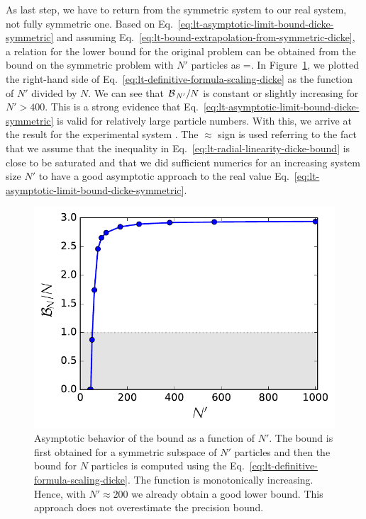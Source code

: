 As last step, we have to return from the symmetric system to our real system, not fully symmetric one.
Based on Eq.~\eqref{eq:lt-asymptotic-limit-bound-dicke-symmetric} and assuming Eq.~\eqref{eq:lt-bound-extrapolation-from-symmetric-dicke}, a relation for the lower bound for the original problem can be obtained from the bound on the symmetric problem with $N'$ particles as
\be
  \label{eq:lt-definitive-formula-scaling-dicke}
  \approx {}  =.
\ee
In Figure~\ref{fig:assimpthotic-approach-to-the-bound-from-scaled-dicke},
we plotted the right-hand side of Eq.~\eqref{eq:lt-definitive-formula-scaling-dicke} as the function of $N'$ divided by $N$.
We can see that $\mathcal{B}_{\, N' }/N$ is constant or slightly increasing for $N'>400$.
This is a strong evidence that Eq.~\eqref{eq:lt-asymptotic-limit-bound-dicke-symmetric} is valid for relatively large particle numbers.
With this, we arrive at the result for the experimental system
\be
  \label{eq:lt-result-experimental-dicke}
  .
\ee
The $\approx$ sign is used referring to the fact that we assume that the inequality in Eq.~\eqref{eq:lt-radial-linearity-dicke-bound} is close to be saturated and that we did sufficient numerics for an increasing system size $N'$ to have a good asymptotic approach to the real value Eq.~\eqref{eq:lt-asymptotic-limit-bound-dicke-symmetric}.
\begin{figure}[htp]
  \centering
  \includegraphics[scale=.65]{img/LT_dicke_7900_asymp.pdf}
  \caption[Asymptotic behavior of the bound for experimental data producing Dicke states]{
  Asymptotic behavior of the bound as a function of $N'$.
  The bound is first obtained for a symmetric subspace of $N'$ particles and then the bound for $N$ particles is computed using the Eq.~\eqref{eq:lt-definitive-formula-scaling-dicke}.
  The function is monotonically increasing.
  Hence, with $N'\approx200$ we already obtain a good lower bound.
  This approach does not overestimate the precision bound.
  }
  \label{fig:assimpthotic-approach-to-the-bound-from-scaled-dicke}
\end{figure}

